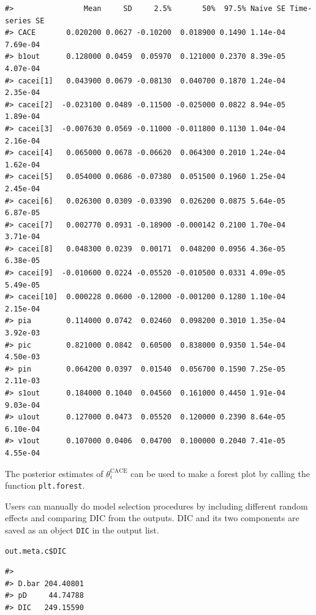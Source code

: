 \begin{verbatim}
#>                Mean     SD     2.5%       50%  97.5% Naive SE Time-series SE
#> CACE       0.020200 0.0627 -0.10200  0.018900 0.1490 1.14e-04       7.69e-04
#> b1out      0.128000 0.0459  0.05970  0.121000 0.2370 8.39e-05       4.07e-04
#> cacei[1]   0.043900 0.0679 -0.08130  0.040700 0.1870 1.24e-04       2.35e-04
#> cacei[2]  -0.023100 0.0489 -0.11500 -0.025000 0.0822 8.94e-05       1.89e-04
#> cacei[3]  -0.007630 0.0569 -0.11000 -0.011800 0.1130 1.04e-04       2.16e-04
#> cacei[4]   0.065000 0.0678 -0.06620  0.064300 0.2010 1.24e-04       1.62e-04
#> cacei[5]   0.054000 0.0686 -0.07380  0.051500 0.1960 1.25e-04       2.45e-04
#> cacei[6]   0.026300 0.0309 -0.03390  0.026200 0.0875 5.64e-05       6.87e-05
#> cacei[7]   0.002770 0.0931 -0.18900 -0.000142 0.2100 1.70e-04       3.71e-04
#> cacei[8]   0.048300 0.0239  0.00171  0.048200 0.0956 4.36e-05       6.38e-05
#> cacei[9]  -0.010600 0.0224 -0.05520 -0.010500 0.0331 4.09e-05       5.49e-05
#> cacei[10]  0.000228 0.0600 -0.12000 -0.001200 0.1280 1.10e-04       2.15e-04
#> pia        0.114000 0.0742  0.02460  0.098200 0.3010 1.35e-04       3.92e-03
#> pic        0.821000 0.0842  0.60500  0.838000 0.9350 1.54e-04       4.50e-03
#> pin        0.064200 0.0397  0.01540  0.056700 0.1590 7.25e-05       2.11e-03
#> s1out      0.184000 0.1040  0.04560  0.161000 0.4450 1.91e-04       9.03e-04
#> u1out      0.127000 0.0473  0.05520  0.120000 0.2390 8.64e-05       6.10e-04
#> v1out      0.107000 0.0406  0.04700  0.100000 0.2040 7.41e-05       4.55e-04
\end{verbatim}

\noindent The posterior estimates of \(\theta^\text{CACE}_i\) can be used to make a forest plot by calling the function \texttt{plt.forest}.

Users can manually do model selection procedures by including different random effects and comparing DIC from the outputs. DIC and its two components are saved as an object \texttt{DIC} in the output list.

\begin{verbatim}
out.meta.c$DIC
\end{verbatim}

\begin{verbatim}
#>                
#> D.bar 204.40801
#> pD     44.74788
#> DIC   249.15590
\end{verbatim}

